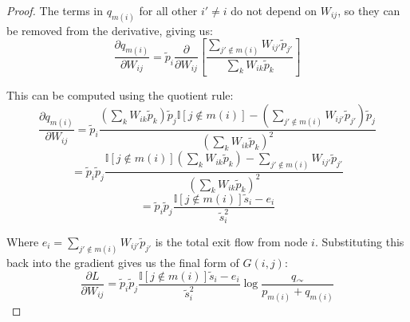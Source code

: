 \documentclass[pdflatex,sn-mathphys-num]{sn-jnl}%
\theoremstyle{thmstyleone}%
\theoremstyle{thmstyletwo}%
\theoremstyle{thmstylethree}%
\begin{document}
\begin{appendices}
\begin{proof}
The terms in $q_{m(i)}$ for all other $i' \neq i$ do not depend on $W_{ij}$, so they can be removed from the derivative, giving us:
$$\frac{\partial q_{m(i)}}{\partial W_{ij}} = \tilde{p}_i \frac{\partial}{\partial W_{ij}} \left[ \frac{\sum_{j' \notin m(i)} W_{ij'} \tilde{p}_{j'}}{\sum_k W_{ik} \tilde{p}_k} \right]$$

This can be computed using the quotient rule:
$$\frac{\partial q_{m(i)}}{\partial W_{ij}} = \tilde{p}_i \frac{\left( \sum_k W_{ik} \tilde{p}_k \right) \tilde{p}_j \mathbb{I}[j \notin m(i)] - \left( \sum_{j' \notin m(i)} W_{ij'} \tilde{p}_{j'} \right) \tilde{p}_j}{\left( \sum_k W_{ik} \tilde{p}_k \right)^2}$$
$$= \tilde{p}_i \tilde{p}_j \frac{\mathbb{I}[j \notin m(i)] \left( \sum_k W_{ik} \tilde{p}_k \right) - \sum_{j' \notin m(i)} W_{ij'} \tilde{p}_{j'}}{\left( \sum_k W_{ik} \tilde{p}_k \right)^2}$$
$$= \tilde{p}_i \tilde{p}_j \frac{\mathbb{I}[j \notin m(i)] \tilde{s}_i - e_i}{\tilde{s}_i^2}$$

Where $e_i = \sum_{j' \notin m(i)} W_{ij'} \tilde{p}_{j'}$ is the total exit flow from node $i$. Substituting this back into the gradient gives us the final form of $G(i, j)$:
$$\frac{\partial L}{\partial W_{ij}} = \tilde{p}_i \tilde{p}_j \frac{\mathbb{I}[j \notin m(i)] \tilde{s}_i - e_i}{\tilde{s}_i^2} \log \frac{q_{\curvearrowright}}{p_{m(i)} + q_{m(i)}}$$
\end{proof}

\end{appendices}
\end{document}
